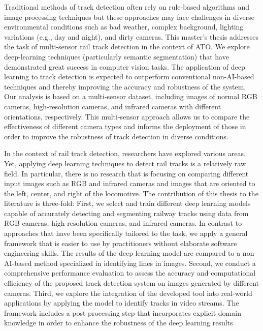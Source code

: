 \documentclass[Master,MDS,english]{BASE/twbook} %
\begin{document}
Traditional methods of track detection often rely on rule-based algorithms and image processing techniques but these approaches may face challenges in diverse environmental conditions such as bad weather, complex background, lighting variations (e.g., day and night), and dirty cameras.
This master's thesis addresses the task of multi-sensor rail track detection in the context of ATO. We explore deep-learning techniques (particularly semantic segmentation) that have demonstrated great success in computer vision tasks. The application of deep learning to track detection is expected to outperform conventional non-AI-based techniques and thereby improving the accuracy and robustness of the system.
Our analysis is based on a multi-sensor dataset, including images of normal RGB cameras, high-resolution cameras, and infrared cameras with different orientations, respectively. This multi-sensor approach allows us to compare the effectiveness of different camera types and informs the deployment of those in order to improve the robustness of track detection in diverse conditions. 

In the context of rail track detection, researchers have explored various areas. Yet, applying deep learning techniques to detect rail tracks is a relatively raw field. In particular, there is no research that is focusing on comparing different input images such as RGB and infrared cameras and images that are oriented to the left, center, and right of the locomotive. 
The contribution of this thesis to the literature is three-fold: First, we select and train different deep learning models capable of accurately detecting and segmenting railway tracks using data from RGB cameras, high-resolution cameras, and infrared cameras. In contrast to approaches that have been specifically tailored to the task, we apply a general framework that is easier to use by practitioners without elaborate software engineering skills.
The results of the deep learning model are compared to a non-AI-based method specialized in identifying lines in images. 
Second, we conduct a comprehensive performance evaluation to assess the accuracy and computational efficiency of the proposed track detection system on images generated by different cameras.
Third, we explore the integration of the developed tool into real-world applications by applying the model to identify tracks in video streams. The framework includes a post-processing step that incorporates explicit domain knowledge in order to enhance the robustness of the deep learning results
\end{document}
